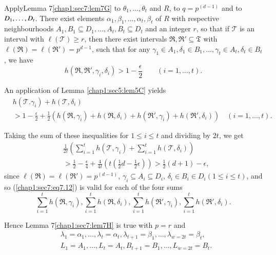 Apply\pageoriginale Lemma 7\ref{chap1:sec7:lem7G} to $\theta_{1},
\ldots, \theta_{t}$ and $R$, to $q = p^{(d-1)}$ and to $D_{1}, \ldots,\break
D_{t}$. There exist elements $\alpha_{1}, \beta_{1}, \ldots,
\alpha_{t}, \beta_{t}$ of $R$ with respective neighbourhoods $A_{1},
B_{1} \subseteq D_{1}, \ldots, A_{t}, B_{t} \subseteq D_{t}$ and an
integer $r$, so that if $\mathscr{T}$ is an interval with $\ell
(\mathscr{T}) \geq r$, then there exist intervals $\mathfrak{R},
\mathfrak{R}' \subseteq \mathfrak{T}$ with $\ell (\mathfrak{R}) = \ell
(\mathfrak{R}') = p^{d-1}$, such that for any $\gamma_{1} \in A_{1},
\delta_{1} \in B_{1}, \ldots, \gamma_{t} \in A_{t}, \delta_{t} \in
B_{t}$, we have 
$$
h(\mathfrak{R}, \mathfrak{R}', \gamma_{i}, \delta_{i}) > 1 - \frac{\epsilon}{2} \qquad(i = 1, \ldots, t).
$$

An application of Lemma \ref{chap1:sec5:lem5C} yields
\begin{align*}
& h(\mathscr{T}. \gamma_{i}) + h(\mathscr{T}, \delta_{i})\\
& > 1 - \frac{\epsilon}{2} + \frac{1}{2} (h(\mathfrak{R}, \gamma_{i}) + h(\mathfrak{R}, \delta_{i}) + h(\mathfrak{R}', \gamma_{i}) + h(\mathfrak{R}', \delta_{i})) \quad(i = 1, \ldots, t).
\end{align*}

Taking the sum of these inequalities for $1 \leq i \leq t$ and dividing by $2t$, we get
\begin{align*}
& \frac{1}{2t} \left(\sum_{i=1}^{t} h(\mathscr{T}, \gamma_{i}) + \sum_{i=1}^{t} h(\mathscr{T}, \delta_{i})\right)\\
& > \frac{1}{2} - \frac{\epsilon}{4} + \frac{4}{4t} (t(\frac{1}{2} d - \frac{1}{2} \epsilon)) > \frac{1}{2} (d+1) - \epsilon,
\end{align*}
since $\ell (\mathfrak{R}) = \ell (\mathfrak{R}') = p^{(d-1)}$, $\gamma_{i} \subseteq A_{i} \subseteq D_{i}$, $\delta_{i} \in B_{i} \in D_{i} (1 \leq i \leq t)$, and so (\ref{chap1:sec7:eq7.12}) is valid for each of the four sums
$$
\sum_{i=1}^{t} h(\mathfrak{R}, \gamma_{i}), \sum_{i=1}^{t} h(\mathfrak{R}, \delta_{i}), \sum_{i=1}^{t} h(\mathfrak{R}', \gamma_{i}), \sum_{i=1}^{t} h(\mathfrak{R}', \delta_{i}).
$$

Hence Lemma 7\ref{chap1:sec7:lem7H} is true with $p = r$ and
\begin{align*}
  & \lambda_{1} = \alpha_{1}, \ldots, \lambda_{t} = \alpha_{t}, \lambda_{t+1} = \beta_{1}, \ldots, \lambda_{w=2t} = \beta_{t},\\
  & L_{1} = A_{1}, \ldots, L_{t} = A_{t}, B_{t+1} = B_{1}, \ldots, L_{w=2t} = B_{t}.
\end{align*}

